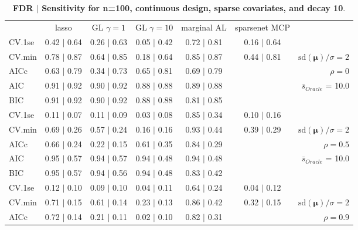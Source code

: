 \clearpage
\begin{table}\vspace{-.5cm}
\caption[l]{ {\it }
{ \bf FDR $\boldsymbol{\mid}$ Sensitivity for n=100, continuous design, sparse covariates, and  decay  10}.}
\vspace{-.5cm}
\footnotesize{}
\begin{center}
\begin{tabular}{l*{5}{c}|r}
 & lasso & GL $\gamma=1$ & GL $\gamma=10$ & marginal AL & sparsenet MCP  & \\
 \cline{1-7}
CV.1se & 0.42 $\mid$ 0.64 & 0.26 $\mid$ 0.63 & 0.05 $\mid$ 0.42 & 0.72 $\mid$ 0.81 & 0.16 $\mid$ 0.64 & \\
CV.min & 0.78 $\mid$ 0.87 & 0.64 $\mid$ 0.85 & 0.18 $\mid$ 0.64 & 0.85 $\mid$ 0.87 & 0.44 $\mid$ 0.81 &  $\mathrm{sd}(\mathbf{\mu})/\sigma=2$ \\
AICc & 0.63 $\mid$ 0.79 & 0.34 $\mid$ 0.73 & 0.65 $\mid$ 0.81 & 0.69 $\mid$ 0.79 & & $\rho=0$ \\
AIC & 0.91 $\mid$ 0.92 & 0.90 $\mid$ 0.92 & 0.88 $\mid$ 0.88 & 0.89 $\mid$ 0.88 & &  \multirow{2}{*}{$\bar{s}_{Oracle}$ = 10.0} \\
BIC & 0.91 $\mid$ 0.92 & 0.90 $\mid$ 0.92 & 0.88 $\mid$ 0.88 & 0.81 $\mid$ 0.85 & &  \\
 \hline 
CV.1se & 0.11 $\mid$ 0.07 & 0.11 $\mid$ 0.09 & 0.03 $\mid$ 0.08 & 0.85 $\mid$ 0.34 & 0.10 $\mid$ 0.16 & \\
CV.min & 0.69 $\mid$ 0.26 & 0.57 $\mid$ 0.24 & 0.16 $\mid$ 0.16 & 0.93 $\mid$ 0.44 & 0.39 $\mid$ 0.29 &  $\mathrm{sd}(\mathbf{\mu})/\sigma=2$ \\
AICc & 0.66 $\mid$ 0.24 & 0.22 $\mid$ 0.15 & 0.61 $\mid$ 0.35 & 0.84 $\mid$ 0.29 & & $\rho=0.5$ \\
AIC & 0.95 $\mid$ 0.57 & 0.94 $\mid$ 0.57 & 0.94 $\mid$ 0.48 & 0.94 $\mid$ 0.48 & &  \multirow{2}{*}{$\bar{s}_{Oracle}$ = 10.0} \\
BIC & 0.95 $\mid$ 0.57 & 0.94 $\mid$ 0.56 & 0.94 $\mid$ 0.48 & 0.83 $\mid$ 0.42 & &  \\
 \hline 
CV.1se & 0.12 $\mid$ 0.10 & 0.09 $\mid$ 0.10 & 0.04 $\mid$ 0.11 & 0.64 $\mid$ 0.24 & 0.04 $\mid$ 0.12 & \\
CV.min & 0.71 $\mid$ 0.15 & 0.61 $\mid$ 0.14 & 0.23 $\mid$ 0.13 & 0.86 $\mid$ 0.42 & 0.32 $\mid$ 0.15 &  $\mathrm{sd}(\mathbf{\mu})/\sigma=2$ \\
AICc & 0.72 $\mid$ 0.14 & 0.21 $\mid$ 0.11 & 0.02 $\mid$ 0.10 & 0.82 $\mid$ 0.31 & & $\rho=0.9$ \\

\end{tabular}
\end{center}
\end{table}
